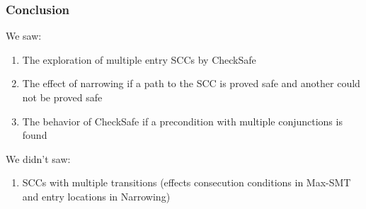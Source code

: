 \documentclass{beamer}
\begin{document}
\begin{frame}
  \frametitle{Conclusion}
  \begin{block}{We saw:}
    \begin{enumerate}
    \item The exploration of multiple entry SCCs by CheckSafe
    \item The effect of narrowing if a path to the SCC is proved safe and another could not be proved safe
    \item The behavior of CheckSafe if a precondition with multiple conjunctions is found
    \end{enumerate}
  \end{block}
  \begin{block}{We didn't saw:}
    \begin{enumerate}
    \item SCCs with multiple transitions (effects consecution conditions in Max-SMT and entry locations in Narrowing)
    \end{enumerate}
  \end{block}
\end{frame}
\end{document}
